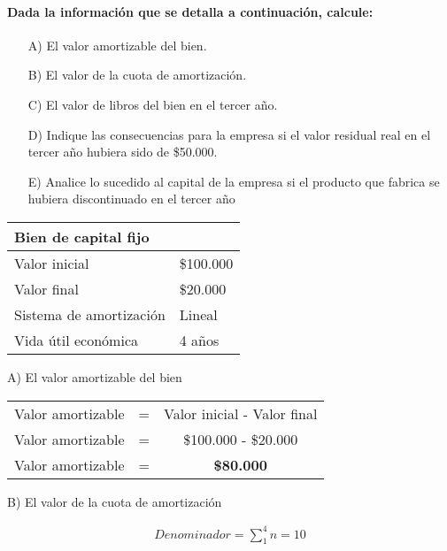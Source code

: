 \documentclass[12pt,a4paper]{article}
\newcommand{\consigna}[1]{\paragraph{\indent #1} \hspace{0pt}}
\begin{document}
        \consigna{Dada la información que se detalla a continuación, calcule:}
        
        \begin{itemize}
			\item[A)]	El valor amortizable del bien.
            \item[B)]	El valor de la cuota de amortización.
            \item[C)]	El valor de libros del bien en el tercer año.
            \item[D)]	Indique las consecuencias para la empresa si el valor residual real en el tercer año hubiera sido de \$50.000.
            \item[E)]	Analice lo sucedido al capital de la empresa si el producto que fabrica se hubiera discontinuado en el tercer año
		\end{itemize}
        
        \begin{table}[H]
        \centering
        	\begin{tabular}{ | l | l | }
            	\hline
                Bien de capital fijo		&				\\ \hline
                Valor inicial				&	\$100.000	\\ \hline
                Valor final					&	\$20.000	\\ \hline
                Sistema de amortización		&	Lineal		\\ \hline
                Vida útil económica			&	4 años		\\ \hline
			\end{tabular}
		\end{table}
        
        A) El valor amortizable del bien
        
        \begin{table}[H]
		\centering
        	\begin{tabular}{ c c c }
            	Valor amortizable	&=&		Valor inicial - Valor final \\
                Valor amortizable	&=&		\$100.000 - \$20.000 \\
                Valor amortizable	&=&		\textbf{\$80.000}
			\end{tabular}
		\end{table}
        
        B) El valor de la cuota de amortización
        
        \begin{align*}
        	Denominador = \sum_{1}^{4} n = 10
		\end{align*}
        
\end{document}
